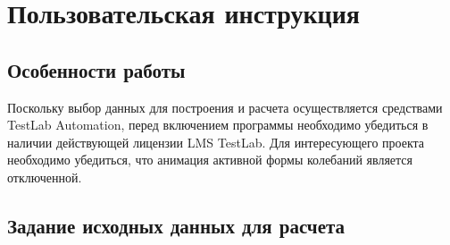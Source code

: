 %
%
%

\chapter{Пользовательская инструкция}

\section{Особенности работы}

Поскольку выбор данных для построения и расчета осуществляется средствами TestLab Automation, перед включением программы необходимо убедиться в наличии действующей лицензии LMS TestLab. Для интересующего проекта необходимо убедиться, что анимация активной формы колебаний является отключенной.

\section{Задание исходных данных для расчета}

